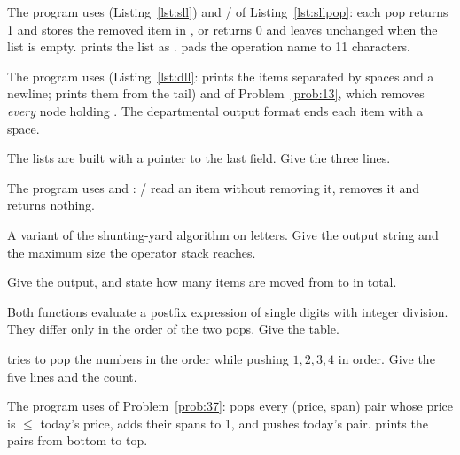 The program uses  (Listing~\ref{lst:sll}) and / of
Listing~\ref{lst:sllpop}: each pop returns 1 and stores the removed item in , or
returns 0 and leaves  unchanged when the list is empty.  prints the
list as \cc{[3 5]}.  pads the operation name to 11 characters.


The program uses  (Listing~\ref{lst:dll}:  prints the items
separated by spaces and a newline;  prints them from the tail) and
 of Problem~\ref{prob:13}, which removes \emph{every} node
holding . The departmental output format ends each item with a space.

The lists are built with a pointer to the last  field. Give the three lines.

The program uses  and : / read an
item without removing it,  removes it and returns nothing.

A variant of the shunting-yard algorithm on letters. Give the output string and the
maximum size the operator stack reaches.

Give the output, and state how many items are moved from  to  in total.

Both functions evaluate a postfix expression of single digits with integer division.
They differ only in the order of the two pops. Give the table.

 tries to pop the numbers in the order  while pushing
$1,2,3,4$ in order. Give the five lines and the count.

The program uses  of Problem~\ref{prob:37}:  pops every
(price, span) pair whose price is $\le$ today's price, adds their spans to 1, and pushes
today's pair.  prints the pairs from bottom to top.

